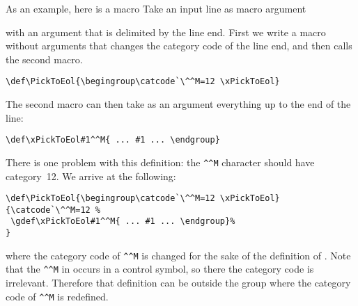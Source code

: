 \documentclass[letterpaper]{book}
\begin{document}
As an example, here is
a macro \label{pick:eol}
\howto Take an input line as macro argument\par
with an argument that is delimited by the line end.
First we write a macro without arguments that 
changes the category code of the line end, and then
calls the second macro.
\begin{verbatim}
\def\PickToEol{\begingroup\catcode`\^^M=12 \xPickToEol}
\end{verbatim}
The second macro can then take as an argument everything
up to the end of the line:
\begin{verbatim}
\def\xPickToEol#1^^M{ ... #1 ... \endgroup}
\end{verbatim}
There is one problem with this definition: the \verb>^^M> character
should have category~12. We arrive at the following:
\begin{verbatim}
\def\PickToEol{\begingroup\catcode`\^^M=12 \xPickToEol}
{\catcode`\^^M=12 %
 \gdef\xPickToEol#1^^M{ ... #1 ... \endgroup}%
}
\end{verbatim}
where the category code of \verb>^^M> is changed for the
sake of the definition of . Note that
the \verb>^^M> in  occurs in a control symbol,
so there the category code  is irrelevant. Therefore that
definition can be outside the group where the category code 
of \verb>^^M> is redefined.
\end{document}
